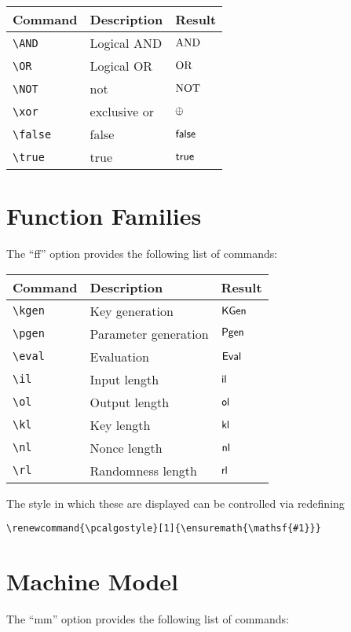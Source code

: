 \documentclass[a4paper]{report}
\begin{document}
\begin{center}
\begin{tabular}{l l l}
\textbf{Command} & \textbf{Description} & \textbf{Result} \\\hline
\lstinline$\AND$ & Logical AND & $\mathrm{AND}$  \\
\lstinline$\OR$ & Logical OR & $\mathrm{OR}$  \\
\lstinline$\NOT$ & not & $\mathrm{NOT}$  \\
\lstinline$\xor$ & exclusive or & $\oplus$  \\
\lstinline$\false$ & false & $\mathsf{false}$  \\
\lstinline$\true$ & true & $\mathsf{true}$  
\end{tabular}
\end{center}


\section{Function Families}
The \enquote{ff} option provides the following list of commands:

\begin{center}
\begin{tabular}{l l l}
\textbf{Command} & \textbf{Description} & \textbf{Result} \\\hline
\lstinline$\kgen$ & Key generation & $\kgen$  \\
\lstinline$\pgen$ & Parameter generation & $\pgen$  \\
\lstinline$\eval$ & Evaluation & $\eval$  \\
\lstinline$\il$ & Input length & $\il$  \\
\lstinline$\ol$ & Output length & $\ol$  \\
\lstinline$\kl$ & Key length & $\kl$  \\
\lstinline$\nl$ & Nonce length & $\nl$  \\
\lstinline$\rl$ & Randomness length & $\rl$  
\end{tabular}
\end{center}

The style in which these are displayed can be controlled via redefining
\begin{lstlisting}
\renewcommand{\pcalgostyle}[1]{\ensuremath{\mathsf{#1}}}
\end{lstlisting}


\section{Machine Model}
The \enquote{mm} option provides the following list of commands:
\end{document}
